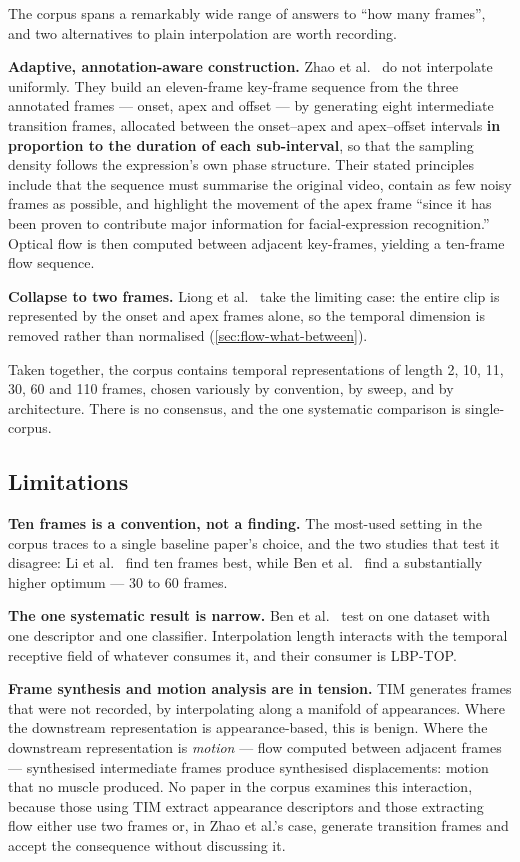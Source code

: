 The corpus spans a remarkably wide range of answers to ``how many frames'', and two alternatives to plain interpolation are worth recording.

\textbf{Adaptive, annotation-aware construction.} Zhao et al.~\cite{zhaoS2021} do not interpolate uniformly. They build an eleven-frame key-frame sequence from the three annotated frames --- onset, apex and offset --- by generating eight intermediate transition frames, allocated between the onset--apex and apex--offset intervals \textbf{in proportion to the duration of each sub-interval}, so that the sampling density follows the expression's own phase structure. Their stated principles include that the sequence must summarise the original video, contain as few noisy frames as possible, and highlight the movement of the apex frame ``since it has been proven to contribute major information for facial-expression recognition.'' Optical flow is then computed between adjacent key-frames, yielding a ten-frame flow sequence.

\textbf{Collapse to two frames.} Liong et al.~\cite{liong2019a,liong2019b} take the limiting case: the entire clip is represented by the onset and apex frames alone, so the temporal dimension is removed rather than normalised (\autoref{sec:flow-what-between}).

Taken together, the corpus contains temporal representations of length 2, 10, 11, 30, 60 and 110 frames, chosen variously by convention, by sweep, and by architecture. There is no consensus, and the one systematic comparison is single-corpus.

\subsection{Limitations}
\label{sec:tim-limitations}

\textbf{Ten frames is a convention, not a finding.} The most-used setting in the corpus traces to a single baseline paper's choice, and the two studies that test it disagree: Li et al.~\cite{liX2018} find ten frames best, while Ben et al.~\cite{ben2021} find a substantially higher optimum --- 30 to 60 frames.

\textbf{The one systematic result is narrow.} Ben et al.~\cite{ben2021} test on one dataset with one descriptor and one classifier. Interpolation length interacts with the temporal receptive field of whatever consumes it, and their consumer is LBP-TOP.

\textbf{Frame synthesis and motion analysis are in tension.} TIM generates frames that were not recorded, by interpolating along a manifold of appearances. Where the downstream representation is appearance-based, this is benign. Where the downstream representation is \textit{motion} --- flow computed between adjacent frames --- synthesised intermediate frames produce synthesised displacements: motion that no muscle produced. No paper in the corpus examines this interaction, because those using TIM extract appearance descriptors and those extracting flow either use two frames or, in Zhao et al.'s case, generate transition frames and accept the consequence without discussing it.

